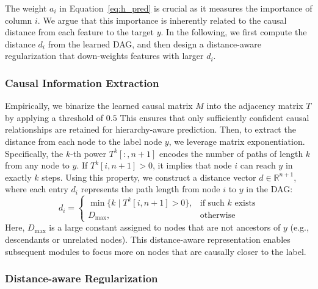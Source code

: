 \documentclass[sigconf, nonacm]{acmart}
\newcommand{\syadd}[1]{{\color{black}#1}}
\newcommand{\syfix}[1]{{\color{black}#1}}
\begin{document}
\syfix{
The weight $a_i$ in Equation~\ref{eq:h_pred} is crucial as it measures the importance of column $i$. 
We argue that this importance is inherently related to the causal distance from each feature to the target $y$. 
In the following, we first compute the distance $d_i$ from the learned DAG, and then design a distance-aware regularization that down-weights features with larger $d_i$.
}

\subsubsection{Causal Information Extraction}
\syadd{
Empirically, we binarize the learned causal matrix $M$ into the adjacency matrix $T$ by applying a threshold of $0.5$
This ensures that only sufficiently confident causal relationships are retained for hierarchy-aware prediction.}
Then, to extract the distance from each node to the label node $y$, we leverage matrix exponentiation. Specifically, the $k$-th power $T^k[:, n+1]$ encodes the number of paths of length $k$ from any node to $y$. If $T^k[i, n+1] > 0$, it implies that node $i$ can reach $y$ in exactly $k$ steps. Using this property, we construct a distance vector $d \in \mathbb{R}^{n+1}$, where each entry $d_i$ represents the path length from node $i$ to $y$ in the DAG:
\begin{equation}
    d_i = 
    \begin{cases}
    \min\{k \mid T^k[i, n+1] > 0\}, & \text{if such } k \text{ exists} \\
    D_{\max}, & \text{otherwise}
    \end{cases}
    \label{eq:distance_matrix}
\end{equation}
\noindent
Here, $D_{\max}$ is a large constant assigned to nodes that are not ancestors of $y$ (e.g., descendants or unrelated nodes). %
This distance-aware representation enables subsequent modules to focus more on nodes that are causally closer to the label.

\subsubsection{Distance-aware Regularization}
\label{sec:reg}
\end{document}
